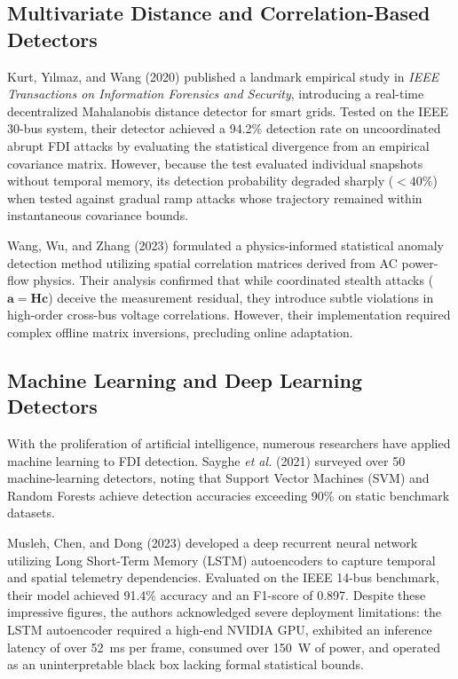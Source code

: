 \documentclass[12pt,a4paper]{report}
\begin{document}
\subsection{Multivariate Distance and Correlation-Based Detectors}
Kurt, Y\i lmaz, and Wang (2020) \cite{kurt2020} published a landmark empirical study in
\textit{IEEE Transactions on Information Forensics and Security}, introducing a real-time
decentralized Mahalanobis distance detector for smart grids. Tested on the IEEE 30-bus
system, their detector achieved a 94.2\% detection rate on uncoordinated abrupt FDI attacks
by evaluating the statistical divergence from an empirical covariance matrix. However, because
the test evaluated individual snapshots without temporal memory, its detection probability
degraded sharply ($< 40\%$) when tested against gradual ramp attacks whose trajectory remained
within instantaneous covariance bounds.

Wang, Wu, and Zhang (2023) \cite{wang2023} formulated a physics-informed statistical anomaly
detection method utilizing spatial correlation matrices derived from AC power-flow physics.
Their analysis confirmed that while coordinated stealth attacks ($\boldsymbol{a} = \boldsymbol{H}\boldsymbol{c}$)
deceive the measurement residual, they introduce subtle violations in high-order cross-bus
voltage correlations. However, their implementation required complex offline matrix inversions,
precluding online adaptation.

\subsection{Machine Learning and Deep Learning Detectors}
With the proliferation of artificial intelligence, numerous researchers have applied
machine learning to FDI detection. Sayghe \textit{et al.} (2021) \cite{sayghe2021} surveyed
over 50 machine-learning detectors, noting that Support Vector Machines (SVM) and Random
Forests achieve detection accuracies exceeding 90\% on static benchmark datasets.

Musleh, Chen, and Dong (2023) \cite{musleh2023} developed a deep recurrent neural network
utilizing Long Short-Term Memory (LSTM) autoencoders to capture temporal and spatial telemetry
dependencies. Evaluated on the IEEE 14-bus benchmark, their model achieved 91.4\% accuracy
and an F1-score of 0.897. Despite these impressive figures, the authors acknowledged severe
deployment limitations: the LSTM autoencoder required a high-end NVIDIA GPU, exhibited an
inference latency of over 52~ms per frame, consumed over 150~W of power, and operated as an
uninterpretable black box lacking formal statistical bounds.
\end{document}
